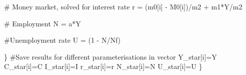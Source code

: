 \documentclass[
  letterpaper,
  DIV=11,
  numbers=noendperiod]{scrreprt}
\newenvironment{Shaded}{\begin{snugshade}}{\end{snugshade}}
\newcommand{\CommentTok}[1]{\textcolor[rgb]{0.37,0.37,0.37}{#1}}
\newcommand{\DecValTok}[1]{\textcolor[rgb]{0.68,0.00,0.00}{#1}}
\newcommand{\NormalTok}[1]{\textcolor[rgb]{0.00,0.23,0.31}{#1}}
\newcommand{\OtherTok}[1]{\textcolor[rgb]{0.00,0.23,0.31}{#1}}
\newcommand{\SpecialCharTok}[1]{\textcolor[rgb]{0.37,0.37,0.37}{#1}}
\begin{document}
\begin{Shaded}
\begin{Highlighting}[]
    \CommentTok{\# Money market, solved for interest rate}
\NormalTok{    r }\OtherTok{=}\NormalTok{ (m0[i] }\SpecialCharTok{{-}}\NormalTok{ M0[i])}\SpecialCharTok{/}\NormalTok{m2 }\SpecialCharTok{+}\NormalTok{ m1}\SpecialCharTok{*}\NormalTok{Y}\SpecialCharTok{/}\NormalTok{m2}
    
    \CommentTok{\# Employment}
\NormalTok{    N }\OtherTok{=}\NormalTok{ a}\SpecialCharTok{*}\NormalTok{Y }
    
    \CommentTok{\#Unemployment rate}
\NormalTok{    U }\OtherTok{=}\NormalTok{ (}\DecValTok{1} \SpecialCharTok{{-}}\NormalTok{ N}\SpecialCharTok{/}\NormalTok{Nf)}
    
\NormalTok{  \}}
  \CommentTok{\#Save results for different parameterisations in vector}
\NormalTok{  Y\_star[i]}\OtherTok{=}\NormalTok{Y}
\NormalTok{  C\_star[i]}\OtherTok{=}\NormalTok{C}
\NormalTok{  I\_star[i]}\OtherTok{=}\NormalTok{I}
\NormalTok{  r\_star[i]}\OtherTok{=}\NormalTok{r}
\NormalTok{  N\_star[i]}\OtherTok{=}\NormalTok{N}
\NormalTok{  U\_star[i]}\OtherTok{=}\NormalTok{U}
\NormalTok{\}}
\end{Highlighting}
\end{Shaded}
\end{document}
